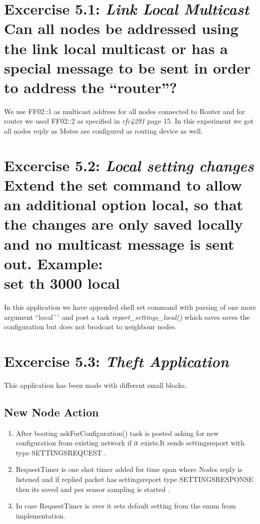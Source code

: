 \documentclass[11pt]{article} %
\begin{document}
\section*{Excercise 5.1: \textnormal{\large{\textit{Link Local Multicast} Can all nodes be addressed using the link
local multicast or has a special message to be sent in order to address the “router”? }}}

We use FF02::1 as multicast address for all nodes connected to Router and for router we used FF02::2 as specified in \textit{rfc4291} page 15.
In this experiment we got all nodes reply as Motes are configured as routing device as well.  


\section*{Excercise 5.2: \textnormal{\large{\textit{Local setting changes} Extend the set command to allow an additional
option local, so that the changes are only saved locally and no multicast
message is sent out. Example: \\
\textbf{set th 3000 local} }}}

In this application we have appended shell set command with parsing of one more argument ``local´´ and post a task \textit{ report\_settings\_local() } which saves saves the configuration but does not brodcast to neighbour nodes.

\section*{Excercise 5.3: \textnormal{\large{\textit{Theft Application} }}}
This application has been made with different small blocks. 
\subsection*{New Node Action}
\begin{enumerate}
\item After booting askForConfiguration() task is posted asking for new configuration from existing network if it exists.It sends settings\textunderscore report with type SETTINGS\textunderscore REQUEST .
\item RequestTimer is one shot timer added for time span where Nodes reply is listened and if replied packet has settings\textunderscore report type SETTINGS\textunderscore RESPONSE then its saved and per sensor sampling is started .
\item In case RequestTimer is over it sets default setting from the enum from implementation.
\end{enumerate}
\end{document}
